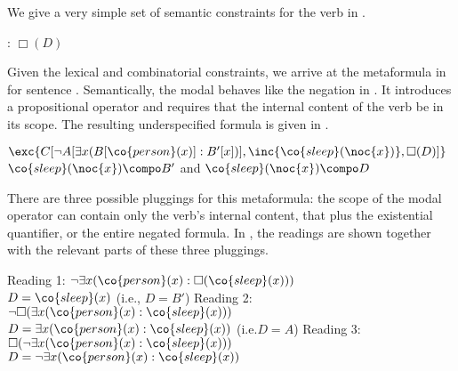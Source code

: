 \documentclass[output=paper]{langsci/langscibook}
\begin{document}
We give a very simple set of semantic constraints for the verb  in .%

\ea \label{le-must}
: $\Box (D)$
\z 

Given the lexical and combinatorial constraints, we arrive at the metaformula in  for sentence . Semantically, the modal behaves like the negation in . 
It introduces a propositional operator and requires that the internal content of the verb  be in its scope. The resulting underspecified formula is given in .

\ea \label{niemand-muss-lf}
$\exc{C[\lnot A[\exists x (B[\co{person}(x)] : B'[x])], \inc{\co{sleep}(\noc{x})}, \Box(D)]}$\\
$\co{sleep}(\noc{x}) \compo B'$
and
$\co{sleep}(\noc{x}) \compo D$
\z 

\begin{sloppypar}
  There are three possible pluggings for this metaformula: the scope
  of the modal operator can contain only the verb's internal content,
  that plus the existential quantifier, or the entire negated
  formula. In , the readings are shown
  together with the relevant parts of these three pluggings.
\end{sloppypar}

\ea \label{niemand-muss-plug}
\begin{xlist}
\ex Reading 1: $\lnot \exists x (\co{person}(x) : \Box (\co{sleep}(x)))$\\
\hspace*{5em} $D = \co{sleep}(x)$ (i.e., $D = B'$)
\ex Reading 2: $\lnot \Box (\exists x (\co{person}(x) : \co{sleep}(x)))$\\
\hspace*{5em} $D = \exists x (\co{person}(x) : \co{sleep}(x))$ (i.e.\@ $D = A$)
\ex Reading 3: $\Box (\lnot \exists x (\co{person}(x) : \co{sleep}(x)))$\\
\hspace*{5em} $D = \lnot \exists x (\co{person}(x) : \co{sleep}(x))$
\end{xlist}
\z 
\end{document}
